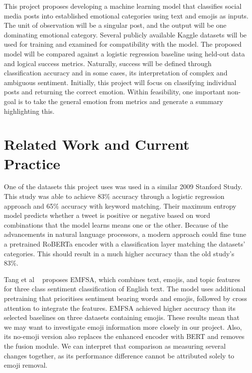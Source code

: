 \documentclass[sigconf,nonacm]{acmart}
\begin{document}
This project proposes developing a machine learning model that classifies social media posts into established emotional categories using text and emojis as inputs. The unit of observation will be a singular post, and the output will be one dominating emotional category. Several publicly available Kaggle datasets will be used for training and  examined for compatibility with the model. The proposed model will be compared against a logistic regression baseline using held-out data and logical success metrics. Naturally, success will be defined through classification accuracy and in some cases, its interpretation of complex and ambiguous sentiment. Initially, this project will focus on classifying individual posts and returning the correct emotion. Within feasibility, one important non-goal is to take the general emotion from metrics and generate a summary highlighting this.


\section{Related Work and Current Practice}
One of the datasets this project uses was used in a similar 2009 Stanford Study. ~\cite{go2009twitter}  This study was able to achieve 83\% accuracy through a logistic regression approach and 65\% accuracy with keyword matching.  Their maximum entropy model predicts whether a tweet is positive or negative based on word combinations that the model learns means one or the other.  Because of the advancements in natural language processors, a modern approach could fine tune a pretrained RoBERTa encoder with a classification layer matching the datasets' categories.  This should result in a much higher accuracy than the old study's 83\%.

Tang et al ~\cite{tang2024emfsa} proposes EMFSA, which combines text, emojis, and topic features for three class sentiment classification of English text.  The model uses additional pretraining that prioritises sentiment bearing words and emojis, followed by cross attention to integrate the features.  EMFSA achieved higher accuracy than its selected baselines on three datasets containing emojis.  These results mean that we may want to investigate emoji information more closely in our project.  Also, its no-emoji version also replaces the enhanced encoder with BERT and removes the fusion module.  We can interpret that comparison as measuring several changes together, as its performance difference cannot be attributed solely to emoji removal.
\end{document}
